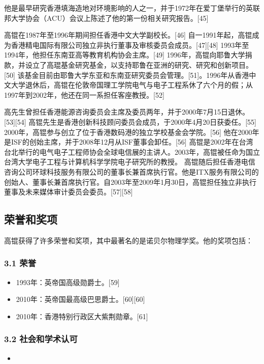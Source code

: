 他是最早研究香港填海造地对环境影响的人之一，并于1972年在爱丁堡举行的英联邦大学协会（ACU）会议上陈述了他的第一份相关研究报告。[45]

高锟在1987年至1996年期间担任香港中文大学副校长。[46] 自一1991年起，高锟成为香港精电国际有限公司独立非执行董事及审核委员会成员。[47][48] 1993年至1994年，他担任东南亚高等教育机构协会主席。[49] 1996年，高锟向耶鲁大学捐款，并设立了高琨基金研究基金，以支持耶鲁在亚洲的研究、研究和创新项目。[50] 该基金目前由耶鲁大学东亚和东南亚研究委员会管理。[51]。1996年从香港中文大学退休后，高锟在伦敦帝国理工学院电气与电子工程系休了六个月的假；从1997年到2002年，他还在同一系担任客座教授。[52]

高先生曾担任香港能源咨询委员会主席及委员两年，并于2000年7月15日退休。[53][54] 高锟先生是香港创新科技顾问委员会成员，于2000年4月20日获委任。[55] 2000年，高锟参与创立了位于香港数码港的独立学校基金会学院。[56] 他在2000年是ISF的创始主席，并于2008年12月从ISF董事会卸任。[56] 高锟是2002年在台湾台北举行的电气电子工程师协会全球电信展的主讲人。2003年，高锟被任命为国立台湾大学电子工程与计算机科学学院电子研究所的教授。 高锟随后担任香港电信咨询公司环球科技服务有限公司的董事长兼首席执行官。他是ITX服务有限公司的创始人、董事长兼首席执行官。自2003年至2009年1月30日，高锟担任独立非执行董事及未来媒体审计委员会委员。[57][58]

\subsection{荣誉和奖项}
高锟获得了许多荣誉和奖项，其中最著名的是诺贝尔物理学奖。他的奖项包括：
\subsubsection{3.1 荣誉}
\begin{itemize}
\item 1993年：英帝国高级勋爵士。[59]
\item 2010年：英帝国最高级巴思爵士。[60][60]
\item 2010年：香港特别行政区大紫荆勋章。[61]
\end{itemize}
\subsubsection{3.2 社会和学术认可}
\begin{itemize}
\item 
\end{itemize}
